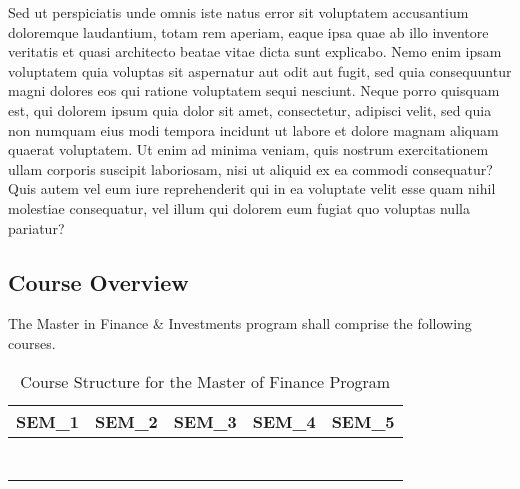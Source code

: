 \documentclass[16,a4paperpaper,]{article}
\begin{document}
Sed ut perspiciatis unde omnis iste natus error sit voluptatem
accusantium doloremque laudantium, totam rem aperiam, eaque ipsa quae ab
illo inventore veritatis et quasi architecto beatae vitae dicta sunt
explicabo. Nemo enim ipsam voluptatem quia voluptas sit aspernatur aut
odit aut fugit, sed quia consequuntur magni dolores eos qui ratione
voluptatem sequi nesciunt. Neque porro quisquam est, qui dolorem ipsum
quia dolor sit amet, consectetur, adipisci velit, sed quia non numquam
eius modi tempora incidunt ut labore et dolore magnam aliquam quaerat
voluptatem. Ut enim ad minima veniam, quis nostrum exercitationem ullam
corporis suscipit laboriosam, nisi ut aliquid ex ea commodi consequatur?
Quis autem vel eum iure reprehenderit qui in ea voluptate velit esse
quam nihil molestiae consequatur, vel illum qui dolorem eum fugiat quo
voluptas nulla pariatur?

\subsection{Course Overview}

The Master in Finance \& Investments program shall comprise the
following courses.

\begin{table}[!h]

\caption{\label{tab:unnamed-chunk-1}Course Structure for the Master of Finance Program}
\centering
\begin{tabu} to 
\toprule
SEM\_1 & SEM\_2 & SEM\_3 & SEM\_4 & SEM\_5\\
\midrule
{} &  &  &  & \\
 &  &  &  \vphantom{2} & \\
 &  &  &  & \\
 &  &  &  \vphantom{1} & \\
 &  &  &  & \\
\addlinespace
 &  &  &  & \\
 &  &  &  & \\
\bottomrule
\end{tabu}
\end{table}
\end{document}

